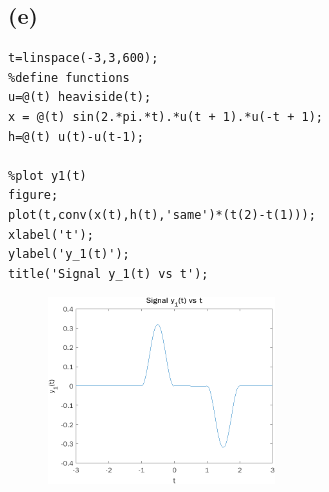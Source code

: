 \documentclass[12pt]{article}
\begin{document}
\subsection*{(e)}
\begin{lstlisting}
t=linspace(-3,3,600);
%define functions
u=@(t) heaviside(t);
x = @(t) sin(2.*pi.*t).*u(t + 1).*u(-t + 1);
h=@(t) u(t)-u(t-1);

%plot y1(t)
figure;
plot(t,conv(x(t),h(t),'same')*(t(2)-t(1)));
xlabel('t');
ylabel('y_1(t)');
title('Signal y_1(t) vs t');
\end{lstlisting}
\begin{figure}[h]\includegraphics[width=6cm]{4e}
\end{figure}
\end{document}
